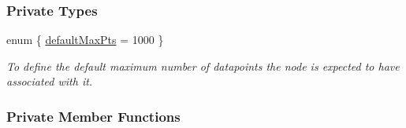 \subsubsection*{\-Private \-Types}
\begin{DoxyCompactItemize}
\item 
enum \{ \hyperlink{classsubpavings_1_1SPSnode_a208ab19f2444e75f9602f8fd136fc03da54168a18fc82748182314929de5e3367}{default\-Max\-Pts} =  1000
 \}
\begin{DoxyCompactList}\small\item\em \-To define the default maximum number of datapoints the node is expected to have associated with it. \end{DoxyCompactList}\end{DoxyCompactItemize}
\subsubsection*{\-Private \-Member \-Functions}
